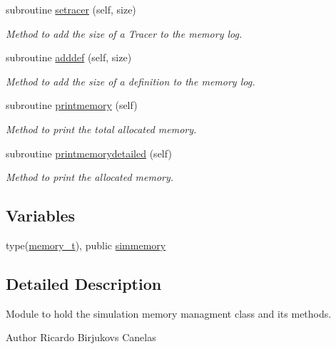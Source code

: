 \begin{DoxyCompactItemize}
subroutine \mbox{\hyperlink{namespacesimulation__memory__mod_a3dfcc0936ad144d609a1b9f9a3a0df6f}{setracer}} (self, size)
\begin{DoxyCompactList}\small\item\em Method to add the size of a Tracer to the memory log. \end{DoxyCompactList}\item 
subroutine \mbox{\hyperlink{namespacesimulation__memory__mod_ac6d6853bc462947d24a8f6234d625138}{adddef}} (self, size)
\begin{DoxyCompactList}\small\item\em Method to add the size of a definition to the memory log. \end{DoxyCompactList}\item 
subroutine \mbox{\hyperlink{namespacesimulation__memory__mod_a16a7a1c7e88fe5a5523d23f83f0e04a0}{printmemory}} (self)
\begin{DoxyCompactList}\small\item\em Method to print the total allocated memory. \end{DoxyCompactList}\item 
subroutine \mbox{\hyperlink{namespacesimulation__memory__mod_a894bd4ec7462fd634d328ee5be4c6483}{printmemorydetailed}} (self)
\begin{DoxyCompactList}\small\item\em Method to print the allocated memory. \end{DoxyCompactList}\end{DoxyCompactItemize}
\subsection*{Variables}
\begin{DoxyCompactItemize}
\item 
type(\mbox{\hyperlink{structsimulation__memory__mod_1_1memory__t}{memory\+\_\+t}}), public \mbox{\hyperlink{namespacesimulation__memory__mod_af3e2714796469b4b1ec247569b184088}{simmemory}}
\end{DoxyCompactItemize}


\subsection{Detailed Description}
Module to hold the simulation memory managment class and its methods. 

\begin{DoxyAuthor}{Author}
Ricardo Birjukovs Canelas 
\end{DoxyAuthor}


